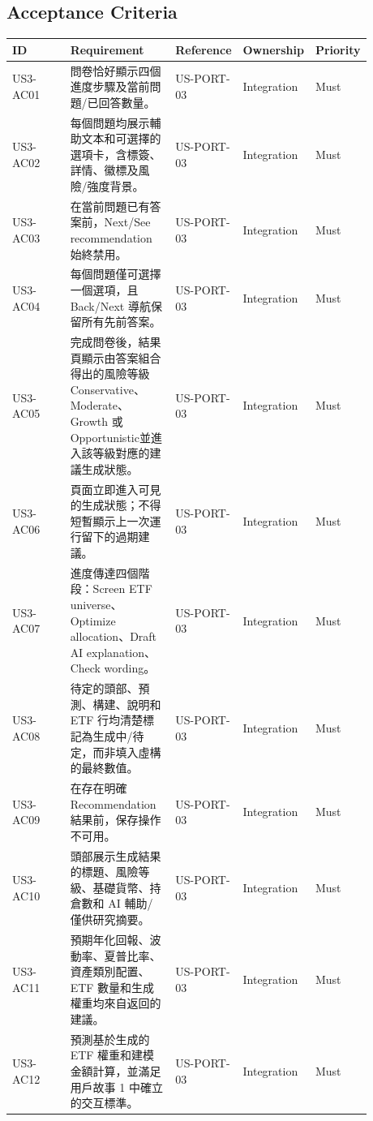 \subsection{Acceptance Criteria}
\begingroup
\small
\begin{longtable}{L{0.18\linewidth}L{0.30\linewidth}L{0.18\linewidth}L{0.12\linewidth}L{0.10\linewidth}}
\toprule
\textbf{ID} & \textbf{Requirement} & \textbf{Reference} & \textbf{Ownership} & \textbf{Priority} \\
\midrule
US3-AC01 & 問卷恰好顯示四個進度步驟及當前問題/\allowbreak{}已回答數量。 & US-PORT-03 & Integration & Must \\
US3-AC02 & 每個問題均展示輔助文本和可選擇的選項卡，含標簽、詳情、徽標及風險/\allowbreak{}強度背景。 & US-PORT-03 & Integration & Must \\
US3-AC03 & 在當前問題已有答案前，Next/\allowbreak{}See recommendation 始終禁用。 & US-PORT-03 & Integration & Must \\
US3-AC04 & 每個問題僅可選擇一個選項，且 Back/\allowbreak{}Next 導航保留所有先前答案。 & US-PORT-03 & Integration & Must \\
US3-AC05 & 完成問卷後，結果頁顯示由答案組合得出的風險等級\textemdash{}\textemdash{}Conservative、Moderate、Growth 或 Opportunistic\textemdash{}\textemdash{}並進入該等級對應的建議生成狀態。 & US-PORT-03 & Integration & Must \\
US3-AC06 & 頁面立即進入可見的生成狀態；不得短暫顯示上一次運行留下的過期建議。 & US-PORT-03 & Integration & Must \\
US3-AC07 & 進度傳達四個階段：Screen ETF universe、Optimize allocation、Draft AI explanation、Check wording。 & US-PORT-03 & Integration & Must \\
US3-AC08 & 待定的頭部、預測、構建、說明和 ETF 行均清楚標記為生成中/\allowbreak{}待定，而非填入虛構的最終數值。 & US-PORT-03 & Integration & Must \\
US3-AC09 & 在存在明確 Recommendation 結果前，保存操作不可用。 & US-PORT-03 & Integration & Must \\
US3-AC10 & 頭部展示生成結果的標題、風險等級、基礎貨幣、持倉數和 AI 輔助/\allowbreak{}僅供研究摘要。 & US-PORT-03 & Integration & Must \\
US3-AC11 & 預期年化回報、波動率、夏普比率、資產類別配置、ETF 數量和生成權重均來自返回的建議。 & US-PORT-03 & Integration & Must \\
US3-AC12 & 預測基於生成的 ETF 權重和建模金額計算，並滿足用戶故事 1 中確立的交互標準。 & US-PORT-03 & Integration & Must \\

\end{longtable}
